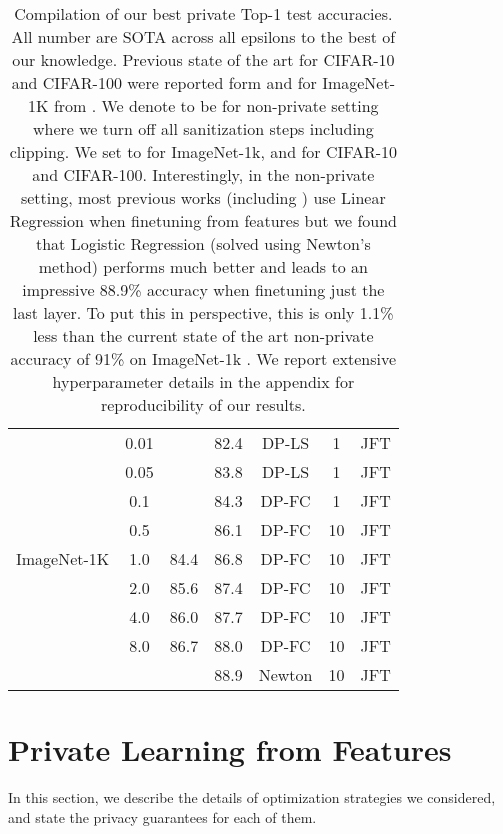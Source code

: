 \documentclass[letterpaper]{article} \usepackage{fullpage}
\begin{document}
\begin{table}[]
\begin{tabular}{lcccccc}
\multirow{9}{*}{ImageNet-1K} 
&         0.01&         & 82.4 & DP-LS & 1 & JFT \\
&         0.05&         & 83.8 & DP-LS & 1 & JFT \\
&         0.1 &        & 84.3 & DP-FC & 1 & JFT \\
&         0.5 &        & 86.1 & DP-FC & 10 & JFT \\
&        1.0  &   84.4    & 86.8 & DP-FC & 10 & JFT\\
&       2.0   &  85.6    & 87.4 & DP-FC & 10 & JFT\\
&      4.0    &  86.0   & 87.7 & DP-FC & 10 & JFT\\
&     8.0     &  86.7  & 88.0 & DP-FC & 10 & JFT\\
&     &   & 88.9 & Newton & 10 & JFT\\

\bottomrule
    \end{tabular}
        \caption{Compilation of our best private Top-1 test accuracies. All number are SOTA across all epsilons to the best of our knowledge. Previous state of the art for CIFAR-10 and CIFAR-100 were reported form \cite{bu2022scalable_oldsota} and for ImageNet-1K from \cite{dm_transfer_2022}. We denote  to be  for non-private setting where we turn off all sanitization steps including clipping. We set  to  for ImageNet-1k, and  for CIFAR-10 and CIFAR-100. Interestingly, in the non-private setting, most previous works (including \cite{zhai2021scaling}) use Linear Regression when finetuning from features but we found that Logistic Regression (solved using Newton's method) performs much better and leads to an impressive 88.9\% accuracy when finetuning just the last layer. To put this in perspective, this is only 1.1\% less than the current state of the art non-private accuracy of 91\% on ImageNet-1k \citep{yu2022coca}. We report extensive hyperparameter details in the appendix for reproducibility of our results.}
            \label{tab:method_comparison}
\end{table}







    



\section{Private Learning from Features}
\label{sec:method}
In this section, we describe the details of optimization strategies we considered, and state the privacy guarantees for each of them.
\end{document}
